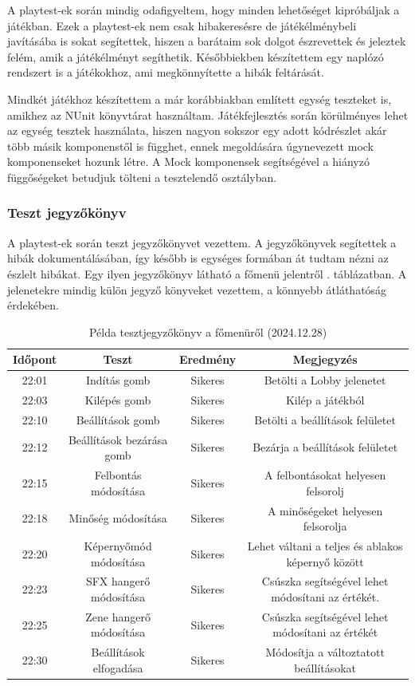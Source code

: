 \documentclass[]{thesis-ekf}
\theoremstyle{definition}
\theoremstyle{remark}
\begin{document}
A playtest-ek során mindig odafigyeltem, hogy minden lehetőséget kipróbáljak a játékban. Ezek a playtest-ek nem csak hibakeresésre de játékélménybeli javításába is sokat segítettek, hiszen a barátaim sok dolgot észrevettek és jeleztek felém, amik a játékélményt segíthetik. Későbbiekben készítettem egy naplózó rendszert is a játékokhoz, ami megkönnyítette a hibák feltárását.

Mindkét játékhoz készítettem a már korábbiakban említett egység teszteket is, amikhez az NUnit könyvtárat használtam. Játékfejlesztés során körülményes lehet az egység tesztek használata, hiszen nagyon sokszor egy adott kódrészlet akár több másik komponenstől is függhet, ennek megoldására úgynevezett mock komponenseket hozunk létre. A Mock komponensek segítségével a hiányzó függőségeket betudjuk tölteni a tesztelendő osztályban. \cite{NUnit}

\subsubsection{Teszt jegyzőkönyv}

A playtest-ek során teszt jegyzőkönyvet vezettem. A jegyzőkönyvek segítettek a hibák dokumentálásában, így később is egységes formában át tudtam nézni az észlelt hibákat. Egy ilyen jegyzőkönyv látható a főmenü jelentről . táblázatban. A jelenetekre mindig külön jegyző könyveket vezettem, a könnyebb átláthatóság érdekében.

\begin{table}[ht!]
	\centering
	\footnotesize
	\begin{tabular}{|c|c|c|c|}
		\hline
		\textbf{Időpont} & \textbf{Teszt} & \textbf{Eredmény} & \textbf{Megjegyzés} \\
		\hline
		22:01 & Indítás gomb & Sikeres & Betölti a Lobby jelenetet \\
        \hline
		22:03 & Kilépés gomb & Sikeres & Kilép a játékból \\
		\hline
		22:10 & Beállítások gomb & Sikeres & Betölti a beállítások felületet \\
		\hline
		22:12 & Beállítások bezárása gomb & Sikeres & Bezárja a beállítások felületet \\
		\hline
		22:15 & Felbontás módosítása & Sikeres & A felbontásokat helyesen felsorolj \\
		\hline
		22:18 & Minőség módosítása & Sikeres & A minőségeket helyesen felsorolja \\
		\hline
		22:20 & Képernyőmód módosítása & Sikeres & Lehet váltani a teljes és ablakos képernyő között \\
		\hline
		22:23 & SFX hangerő módosítása & Sikeres & Csúszka segítségével lehet módosítani az értékét. \\
		\hline
		22:25 & Zene hangerő módosítása & Sikeres & Csúszka segítségével lehet módosítani az értékét \\
		\hline
		22:30 & Beállítások elfogadása & Sikeres & Módosítja a változtatott beállításokat \\
		\hline
	\end{tabular}
	\caption{Példa tesztjegyzőkönyv a főmenüről (2024.12.28)}
	\label{tab-tesztjegyzokonyv}
\end{table}
\end{document}
